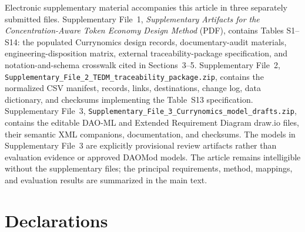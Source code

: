 \documentclass[referee,sn-basic]{sn-jnl}
\newif\ifblindreview
\begin{document}
\backmatter


Electronic supplementary material accompanies this article in three separately
submitted files. Supplementary File~1, \emph{Supplementary Artifacts for the
Concentration-Aware Token Economy Design Method} (PDF), contains Tables
S1--S14: the populated Currynomics design records, documentary-audit materials,
engineering-disposition matrix, external traceability-package specification,
and notation-and-schema crosswalk cited in Sections~3--5. Supplementary File~2,
\texttt{Supplementary\_File\_2\_TEDM\_traceability\_package.zip}, contains the
normalized CSV manifest, records, links, destinations, change log, data
dictionary, and checksums implementing the Table~S13 specification.
Supplementary File~3,
\texttt{Supplementary\_File\_3\_Currynomics\_model\_drafts.zip}, contains the
editable DAO-ML and Extended Requirement Diagram draw.io files, their semantic
XML companions, documentation, and checksums. The models in Supplementary
File~3 are explicitly provisional review artifacts rather than evaluation
evidence or approved DAOMod models. The article remains intelligible without
the supplementary files; the principal requirements, method, mappings, and
evaluation results are summarized in the main text.

\ifblindreview
\bmhead{Acknowledgements}
Acknowledgements withheld for double-anonymous review.
\fi

\section*{Declarations}
\end{document}
